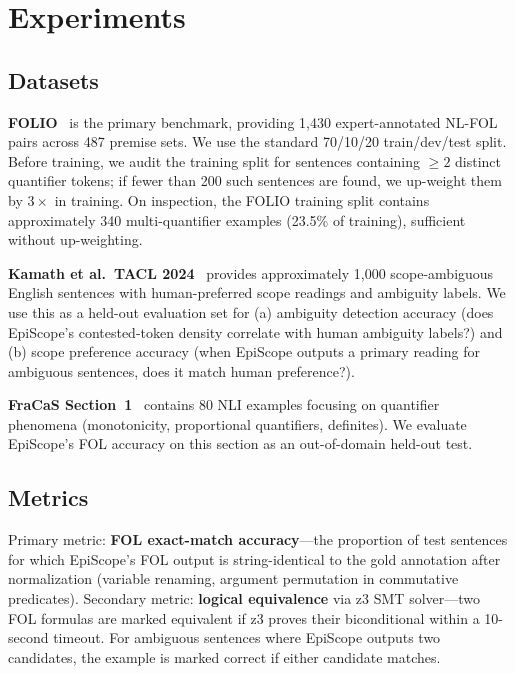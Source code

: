 \documentclass[11pt,letterpaper]{article}
\begin{document}
\section{Experiments}

\subsection{Datasets}

\textbf{FOLIO}~\citep{Han2022} is the primary benchmark, providing 1,430 expert-annotated NL-FOL pairs across
487 premise sets. We use the standard 70/10/20 train/dev/test split. Before training, we audit the training
split for sentences containing $\geq 2$ distinct quantifier tokens; if fewer than 200 such sentences are found,
we up-weight them by $3{\times}$ in training. On inspection, the FOLIO training split contains approximately
340 multi-quantifier examples (23.5\% of training), sufficient without up-weighting.

\textbf{Kamath et al.\ TACL 2024}~\citep{Kamath2024} provides approximately 1,000 scope-ambiguous English
sentences with human-preferred scope readings and ambiguity labels. We use this as a held-out evaluation set
for (a) ambiguity detection accuracy (does EpiScope's contested-token density correlate with human ambiguity
labels?) and (b) scope preference accuracy (when EpiScope outputs a primary reading for ambiguous sentences,
does it match human preference?).

\textbf{FraCaS Section~1}~\citep{Cooper1996} contains 80 NLI examples focusing on quantifier phenomena
(monotonicity, proportional quantifiers, definites). We evaluate EpiScope's FOL accuracy on this section as an
out-of-domain held-out test.

\subsection{Metrics}

Primary metric: \textbf{FOL exact-match accuracy}---the proportion of test sentences for which EpiScope's FOL
output is string-identical to the gold annotation after normalization (variable renaming, argument permutation
in commutative predicates). Secondary metric: \textbf{logical equivalence} via z3 SMT solver---two FOL
formulas are marked equivalent if z3 proves their biconditional within a 10-second timeout. For ambiguous
sentences where EpiScope outputs two candidates, the example is marked correct if either candidate matches.
\end{document}
